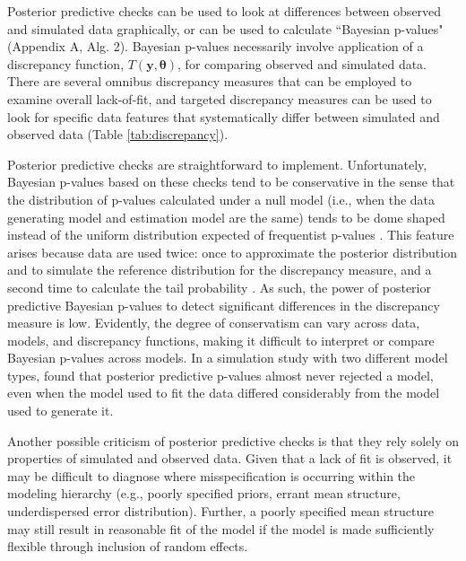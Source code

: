 \documentclass[12pt,english]{article}
\begin{document}
\begin{spacing}{1.9}
Posterior predictive checks can be used to look at differences between
observed and simulated data graphically, or can be used to calculate
``Bayesian p-values" (Appendix A, Alg. 2).  Bayesian p-values
necessarily involve application of a discrepancy function,
$T(\textbf{y},\boldsymbol{\theta})$, for comparing observed and
simulated data.  There are several omnibus discrepancy measures that
can be employed to examine overall lack-of-fit, and targeted
discrepancy measures can be used to look for specific data features
that systematically differ between simulated and observed data (Table
\ref{tab:discrepancy}).

Posterior predictive checks are straightforward to implement.
Unfortunately, Bayesian p-values based on these checks tend to be
conservative in the sense that the distribution of p-values calculated
under a null model (i.e., when the data generating model and
estimation model are the same) tends to be dome shaped instead of the
uniform distribution expected of frequentist p-values
\citep{RobinsEtAl2000}. This feature arises because data are used
twice: once to approximate the posterior distribution and to simulate
the reference distribution for the discrepancy measure, and a second
time to calculate the tail probability \citep{BayarriBerger2000}.  As
such, the power of posterior predictive Bayesian p-values to detect
significant differences in the discrepancy measure is low.  Evidently,
the degree of conservatism can vary across data, models, and
discrepancy functions, making it difficult to interpret or compare
Bayesian p-values across models. In a simulation study with two
different model types, \citet{Zhang2014} found that posterior
predictive p-values almost never rejected a model, even when the model
used to fit the data differed considerably from the model used to
generate it.

Another possible criticism of posterior predictive checks is that they
rely solely on properties of simulated and observed data.  Given that
a lack of fit is observed, it may be difficult to diagnose where
misspecification is occurring within the modeling hierarchy (e.g.,
poorly specified priors, errant mean structure, underdispersed error
distribution).  Further, a poorly specified mean structure may still
result in reasonable fit of the model if the model is made
sufficiently flexible through inclusion of random effects.


\end{spacing}
\end{document}
